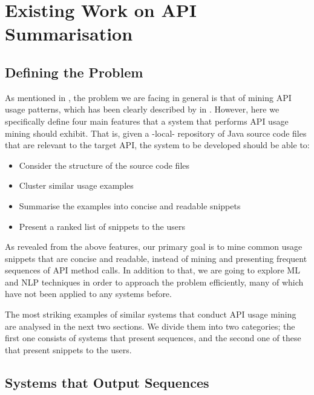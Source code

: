 \chapter{Existing Work on API Summarisation}
\label{chap:existing-work}

\section{Defining the Problem}
\label{sec:problem-definition}

As mentioned in , the problem we are facing in general is that of mining API usage patterns, which has been clearly described by  in \cite{Ishag:2016}. However, here we specifically define four main features that a system that performs API usage mining should exhibit. That is, given a -local- repository of Java source code files that are relevant to the target API, the system to be developed should be able to:

\begin{itemize}
\setlength\itemsep{0.1em}
\item[\featureyes] Consider the structure of the source code files
\item[\featureyes] Cluster similar usage examples
\item[\featureyes] Summarise the examples into concise and readable snippets
\item[\featureyes] Present a ranked list of snippets to the users
\end{itemize}

As revealed from the above features, our primary goal is to mine common usage snippets that are concise and readable, instead of mining and presenting frequent sequences of API method calls. In addition to that, we are going to explore ML and NLP techniques in order to approach the problem efficiently, many of which have not been applied to any systems before.

The most striking examples of similar systems that conduct API usage mining are analysed in the next two sections. We divide them into two categories; the first one consists of systems that present sequences, and the second one of these that present snippets to the users.


\section{Systems that Output Sequences}
\label{sec:sequence-systems}

